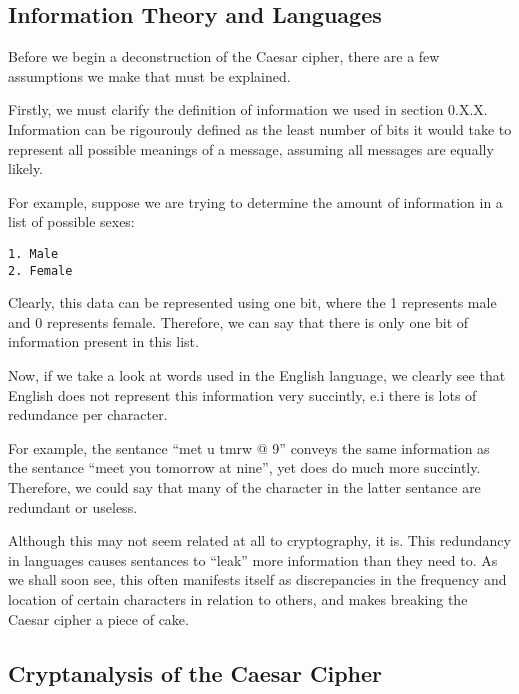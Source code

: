 \documentclass[12pt, a4paper, draft]{report}
\begin{document}

\subsection{Information Theory and Languages}

Before we begin a deconstruction of the Caesar cipher, there are a few
assumptions we make that must be explained.

Firstly, we must clarify the definition of information we used in section
0.X.X. Information can be rigourouly defined as the least number of bits
it would take to represent all possible meanings of a message, assuming
all messages are equally likely.

For example, suppose we are trying to determine the amount of information
in a list of possible sexes:

\begin{center}
\begin{verbatim}
1. Male
2. Female
\end{verbatim}
\end{center}

Clearly, this data can be represented using one bit, where the 1
represents male and 0 represents female. Therefore, we can say that there
is only one bit of information present in this list.

Now, if we take a look at words used in the English language, we clearly
see that English does not represent this information very succintly, e.i
there is lots of redundance per character.

For example, the sentance ``met u tmrw @ 9'' conveys the same information
as the sentance ``meet you tomorrow at nine'', yet does do much more
succintly. Therefore, we could say that many of the character in the
latter sentance are redundant or useless.

Although this may not seem related at all to cryptography, it is. This
redundancy in languages causes sentances to ``leak'' more information than
they need to. As we shall soon see, this often manifests itself as
discrepancies in the frequency and location of certain characters in
relation to others, and makes breaking the Caesar cipher a piece of
cake.


\subsection{Cryptanalysis of the Caesar Cipher}
\end{document}
